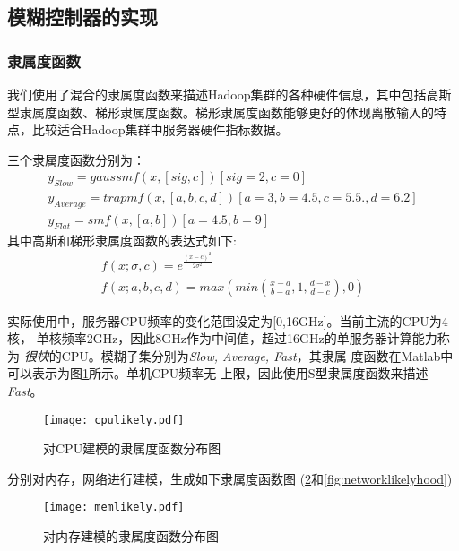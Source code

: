 \subsection{模糊控制器的实现}
\subsubsection{隶属度函数}
我们使用了混合的隶属度函数来描述Hadoop集群的各种硬件信息，其中包括高斯
型隶属度函数、梯形隶属度函数。梯形隶属度函数能够更好的体现离散输入的特
点，比较适合Hadoop集群中服务器硬件指标数据。

三个隶属度函数分别为：
\begin{equation}
  \label{equa:likelyhoods}
  \begin{split}
    y_{Slow} = gaussmf(x, [sig, c])[sig=2, c=0]\\
    y_{Average} = trapmf(x, [a, b, c, d])[a=3, b=4.5, c=5.5., d=6.2]\\
    y_{Flat} = smf(x, [a, b])[a=4.5, b=9]
  \end{split}
\end{equation}
其中高斯和梯形隶属度函数的表达式如下:
\begin{equation}
  \label{equal:two}
  \begin{split}
    f(x;\sigma,c) = e^{\frac{(x-c)^2}{2\sigma^2}}\\
    f(x;a,b,c,d)=max(min(\frac{x-a}{b-a},1,\frac{d-x}{d-c}),0)
  \end{split}
\end{equation}

实际使用中，服务器CPU频率的变化范围设定为[0,16GHz]。当前主流的CPU为4核，
单核频率2GHz，因此8GHz作为中间值，超过16GHz的单服务器计算能力称为
\textit{很快}的CPU。模糊子集分别为\textit{Slow, Average, Fast}，其隶属
度函数在Matlab中可以表示为图\ref{fig:cpulikelyhood}所示。单机CPU频率无
上限，因此使用S型隶属度函数来描述\textit{Fast}。

\begin{figure}[h!]
  \centering
  \texttt{[image: cpulikely.pdf]}
  \caption{对CPU建模的隶属度函数分布图}
  \label{fig:cpulikelyhood}
\end{figure}

分别对内存，网络进行建模，生成如下隶属度函数图
(\ref{fig:memlikelyhood}和\ref{fig:networklikelyhood})

\begin{figure}[h!]
  \centering
  \texttt{[image: memlikely.pdf]}
  \caption{对内存建模的隶属度函数分布图}
  \label{fig:memlikelyhood}
\end{figure}

